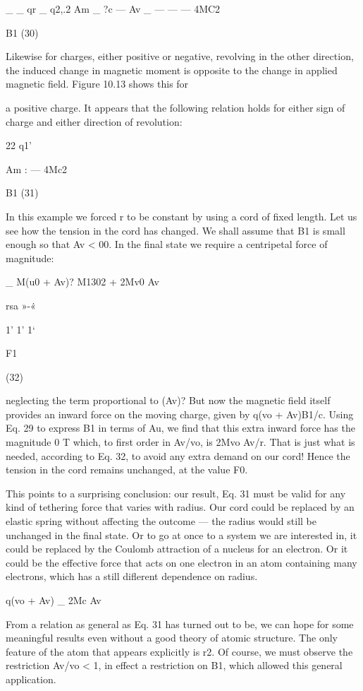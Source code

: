 {{_ _ qr _ q2,.2
Am _ ?c --- Av _  ---  ---  --- 4MC2

B1 (30)

Likewise for charges, either positive or negative, revolving in the
other direction, the induced change in magnetic moment is opposite
to the change in applied magnetic field. Figure 10.13 shows this for

 

a positive charge. It appears that the following relation holds for
either sign of charge and either direction of revolution:

22
q1'

Am :  ---  4Mc2

B1 (31)

In this example we forced r to be constant by using a cord of fixed
length. Let us see how the tension in the cord has changed. We
shall assume that B1 is small enough so that Av < 00. In the final
state we require a centripetal force of magnitude:

_ M(u0 + Av)? M1302 + 2Mv0 Av

rsa
»-\.«

1' 1' 1‘

F1

(32)

neglecting the term proportional to (Av)? But now the magnetic
field itself provides an inward force on the moving charge, given by
q(vo + Av)B1/c. Using Eq. 29 to express B1 in terms of Au, we find
that this extra inward force has the magnitude 0 T
which, to first order in Av/vo, is 2Mvo Av/r. That is just what is
needed, according to Eq. 32, to avoid any extra demand on our cord!
Hence the tension in the cord remains unchanged, at the value F0.

This points to a surprising conclusion: our result, Eq. 31 must be
valid for any kind of tethering force that varies with radius. Our
cord could be replaced by an elastic spring without affecting the
outcome --- the radius would still be unchanged in the final state.
Or to go at once to a system we are interested in, it could be replaced
by the Coulomb attraction of a nucleus for an electron. Or it could
be the effective force that acts on one electron in an atom containing
many electrons, which has a still diflerent dependence on radius.

q(vo + Av) _ 2Mc Av

From a relation as general as Eq. 31 has turned out to be, we can hope
for some meaningful results even without a good theory of atomic
structure. The only feature of the atom that appears explicitly is r2.
Of course, we must observe the restriction Av/vo < 1, in effect a
restriction on B1, which allowed this general application.

}}
